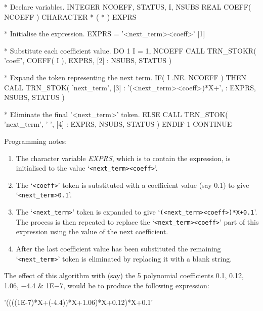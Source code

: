 \documentclass[twoside,nolof,11pt]{starlink}
\providecommand{\fortvar}[1]{\emph{#1}}
\begin{document}
\begin{terminalv}
*  Declare variables.
      INTEGER NCOEFF, STATUS, I, NSUBS
      REAL COEFF( NCOEFF )
      CHARACTER * ( * ) EXPRS

*  Initialise the expression.
      EXPRS = '<next_term><coeff>'                     [1]

*  Substitute each coefficient value.
      DO 1 I = 1, NCOEFF
         CALL TRN_STOKR( 'coeff', COEFF( I ), EXPRS,   [2]
     :                   NSUBS, STATUS )

*  Expand the token representing the next term.
         IF( I .NE. NCOEFF ) THEN
            CALL TRN_STOK( 'next_term',                [3]
     :                     '(<next_term><coeff>)*X+',
     :                     EXPRS, NSUBS, STATUS )

*  Eliminate the final '<next_term>' token.
         ELSE
            CALL TRN_STOK( 'next_term', ' ',           [4]
     :                     EXPRS, NSUBS, STATUS )
         ENDIF
   1  CONTINUE

\end{terminalv}

Programming notes:

\begin{enumerate}

\item The character variable \fortvar{EXPRS}, which is to contain the
expression, is initialised to the value `\verb#<next_term><coeff>#'.

\item The `\verb#<coeff>#' token is substituted with a coefficient
value (say 0.1) to give `\verb#<next_term>0.1#'.

\item The `\verb#<next_term>#' token is expanded to give
`\verb#(<next_term><coeff>)*X+0.1#'.
The process is then repeated to replace the `\verb#<next_term><coeff>#'
part of this expression using the value of the next coefficient.

\item After the last coefficient value has been substituted the remaining
`\verb#<next_term>#' token is eliminated by replacing it with a blank
string.

\end{enumerate}

The effect of this algorithm with (say) the 5 polynomial coefficients 0.1,
0.12, 1.06, $-$4.4 \& 1E$-$7, would be to produce the following expression:

\begin{terminalv}
'((((1E-7)*X+(-4.4))*X+1.06)*X+0.12)*X+0.1'
\end{terminalv}
\end{document}
